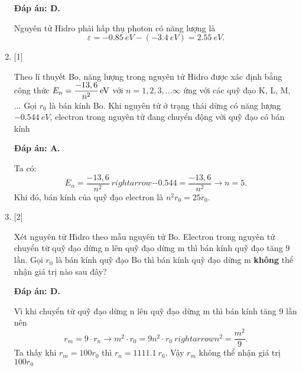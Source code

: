 \begin{enumerate}[label=\bfseries Câu \arabic*:]
		\loigiai
		{		\textbf{Đáp án: D.}
		
Nguyên tử Hidro phải hấp thụ photon có năng lượng là
$$
	\varepsilon = \SI{-0,85}{eV} - \left( \SI{-3,4}{eV} \right) = \SI{2,55}{eV}.
$$	
		}
	
		\item {} [1]
	
		\cauhoi
		{Theo lí thuyết Bo, năng lượng trong nguyên tử Hidro được xác định bằng công thức $ E_{n} = \xsi{\dfrac{-13,6}{n^{2}}}{eV}$ với $ n = 1, 2, 3, ...\infty $ ứng với các quỹ đạo K, L, M, ... Gọi $ r_{0} $ là bán kính Bo. Khi nguyên tử ở trạng thái dừng có năng lượng $ \SI{-0,544}{eV} $, electron trong nguyên tử đang chuyển động với quỹ đạo có bán kính
		}
	
		\loigiai
		{		\textbf{Đáp án: A.}

Ta có:
$$
	E_{n} = \dfrac{-13,6}{n^{2}} \ rightarrow \num{-0,544} = \dfrac{-13,6}{n^{2}} \rightarrow n = 5.
$$		
Khi đó, bán kính của quỹ đạo electron là $ n^{2} r_{0} = 25 r_{0}$.
		}
		
		\item {} [2]
	
		\cauhoi
		{Xét nguyên tử Hidro theo mẫu nguyên tử Bo. Electron trong nguyên tử chuyển từ quỹ đạo dừng n lên quỹ đạo dừng m thì bán kính quỹ đạo tăng 9 lần. Gọi $ r_{0} $ là bán kính quỹ đạo Bo thì bán kính quỹ đạo dừng m \textbf{không} thể nhận giá trị nào sau đây?
		}
	
		\loigiai
		{		\textbf{Đáp án: D.}

Vì khi chuyển từ quỹ đạo dừng n lên quỹ đạo dừng m thì bán kính tăng 9 lần nên
$$
r_{m} = 9 \cdot r_{n} \rightarrow m^{2} \cdot r_{0} = 9 n^{2} \cdot r_{0} \ rightarrow n^{2} = \dfrac{m^{2}}{9}.
$$		
Ta thấy khi $ r_{m} = 100 r_{0} $ thì $ r_{n} = \SI{1111,1}{r_{0}}$.
Vậy $ r_{m} $ không thể nhận giá trị $ 100 r_{0} $
		}
		

\end{enumerate}

